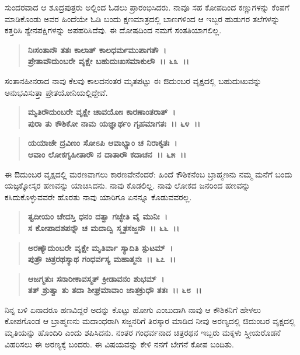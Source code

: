 ಸುಂದರವಾದ ಆ ಶೂದ್ರಪುತ್ರರು ಅಲ್ಲಿಂದ ಓಡಲು ಪ್ರಾರಂಭಿಸಿದರು. ನಾವೂ ಸಹ ಕೋಪದಿಂದ ಕಣ್ಣುಗಳನ್ನು ಕೆಂಪಗೆ ಮಾಡಿಕೊಂಡು ಅವರ ಹಿಂದೆಯೇ ಓಡಿ ಬಂದು ಕ್ಷಣಮಾತ್ರದಲ್ಲಿ ಬಾಣಗಳಿಂದ ಆ ಇಬ್ಬರ ಹುಡುಗರ ತಲೆಗಳನ್ನು ಕತ್ತರಿಸಿ ಶ್ಯೇನಪಕ್ಷಿಗಳನ್ನು ಅಪಹರಿಸಿದೆವು. ಈ ದೋಷದಿಂದ ನಮಗೆ ಸಂತತಿಯಾಗಲಿಲ್ಲ.

\begin{verse}
\textbf{ನಿಃಸಂತಾನೌ ತತಃ ಕಾಲಾತ್ ಕಾಲಧರ್ಮಮುಪಾಗತೌ~।}\\\textbf{ಪ್ರೇತಾವೌದುಂಬರೇ ವೃಕ್ಷೇ ಬಹುದುಃಖಸಮಾಕುಲೌ~।। ೬೩~।।}
\end{verse}

ಸಂತಾನಹೀನರಾದ ನಾವು ಕೆಲವು ಕಾಲದನಂತರ ಮೃತಪಟ್ಟು ಈ ಔದುಂಬರ ವೃಕ್ಷದಲ್ಲಿ ಬಹುದುಃಖವನ್ನು ಅನುಭವಿಸುತ್ತಾ ಪ್ರೇತಯೋನಿಯಲ್ಲಿದ್ದೇವೆ.

\begin{verse}
\textbf{ಮೃತಿರೌ‌ದುಂಬರೇ ವೃಕ್ಷೇ ಚಾವಯೋಃ ಕಾರಣಾಂತರಾತ್~।}\\\textbf{ಪುರಾ ತು ಕೌಶಿಕೋ ನಾಮ ಯಜ್ಞಾರ್ಥಂ ಗೃಹಮಾಗತಃ~।। ೬೪~।।}
\end{verse}

\begin{verse}
\textbf{ಯಯಾಚೇ ದ್ರವಿಣಂ ಸೋಽಪಿ ಆವಾಭ್ಯಾಂ ಚ ನಿರಾಕೃತಃ~।}\\\textbf{ಆವಾಂ ಲೋಕಗೃಹೀತಾರೌ ನ ದಾತಾರೌ ಕದಾಚನ~।। ೬೫~।।}
\end{verse}

ಈ ಔದುಂಬರ ವೃಕ್ಷದಲ್ಲಿ ಮರಣವಾಗಲು ಕಾರಣವೇನೆಂದರೆ: ಹಿಂದೆ ಕೌಶಿಕನೆಂಬ ಬ್ರಾಹ್ಮಣನು ನಮ್ಮ ಮನೆಗೆ ಬಂದು ಯಜ್ಞಕ್ಕೋಸ್ಕರ ಹಣವನ್ನು ಯಾಚಿಸಿದನು. ನಾವು ಕೊಡಲಿಲ್ಲ. ನಾವು ಲೋಕದ ಜನರಿಂದ ಹಣವನ್ನು ಕಸಿದುಕೊಳ್ಳುವವರೇ ಹೊರತು ನಾವು ಯಾರಿಗೂ ಏನನ್ನೂ ಕೊಡುವವರಲ್ಲ.

\begin{verse}
\textbf{ತ್ವದೀಯಂ ಚೇದಸ್ತಿ ಧನಂ ದತ್ವಾ ಗಚ್ಛೇತಿ ವೈ ಮುನಿಃ~।}\\\textbf{ಸ ಕೋಪಾದಶಪನ್ನೌ ಚ ಮದಾದ್ವಿ ಸ್ಮೃತಸಜ್ಜನೌ~।। ೬೬~।।} 
\end{verse}

\begin{verse}
\textbf{ಅರಣ್ಯೌದುಂಬರೇ ವೃಕ್ಷೇ ಮೃತಿರ್ವಾ ಸ್ಯಾದಿತಿ ಸ್ಪುಟಮ್~।}\\\textbf{ಪುತ್ರೌ ಚಿತ್ರರಥಸ್ಯಾಥ ಗಂಧರ್ವಸ್ಯ ಮಹಾತ್ಮನಃ~।। ೬೭~।।} 
\end{verse}

\begin{verse}
\textbf{ಆಜಗ್ಮತುಃ ಸನಾರೀಕಾವಸ್ಮತ್ ಕ್ರೀಡಾವನಂ ಶುಭಮ್~।}\\\textbf{ತತ್ ಶ್ರುತ್ವಾ ತು ತದಾ ಶೀಘ್ರಮಾವಾಂ ಜಾತಕ್ರುಧೌ ತತಃ~।। ೬೮~।।}
\end{verse}

ನಿನ್ನ ಬಳಿ ಏನಾದರೂ ಹಣವಿದ್ದರೆ ಅದನ್ನು ಕೊಟ್ಟು ಹೋಗು ಎಂಬುದಾಗಿ ನಾವು ಆ ಕೌಶಿಕನಿಗೆ ಹೇಳಲು ಕೋಪಗೊಂಡ ಆ ಬ್ರಾಹ್ಮಣನು ಮದಾಂಧರಾಗಿ ಸಜ್ಜನರಿಗೆ ತಿರಸ್ಕಾರ ಮಾಡಿದ ನೀವು ಅರಣ್ಯದಲ್ಲಿ ಔದುಂಬರ ವೃಕ್ಷದಲ್ಲಿ ಮೃತಿಯನ್ನು ಹೊಂದಿರಿ ಎಂದು ಶಪಿಸಿದನು. ನಂತರ ಗಂಧರ್ವನಾದ ಚಿತ್ರರಥನ ಇಬ್ಬರು ಮಕ್ಕಳು ಸ್ತ್ರೀಯರೊಡನೆ ವಿಹರಿಸಲು ಈ ಅರಣ್ಯಕ್ಕೆ ಬಂದರು. ಈ ವಿಷಯವನ್ನು ಕೇಳಿ ನನಗೆ ಬೇಗನೆ ಕೋಪ ಬಂದಿತು.

